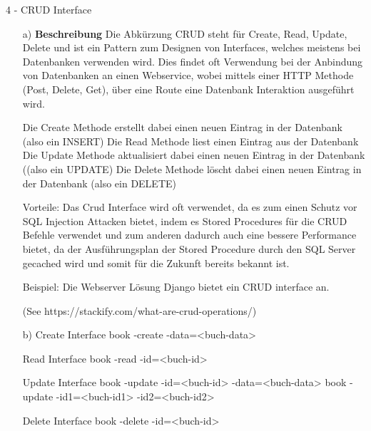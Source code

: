 \documentclass[a4paper]{article}
\begin{document}
\begin{exercise}{4 - CRUD Interface} 
\begin{itemize}
\item[a)]\textbf{Beschreibung}
Die Abkürzung CRUD steht für Create, Read, Update, Delete und ist ein Pattern zum
Designen von Interfaces, welches meistens bei Datenbanken verwenden wird.
Dies findet oft Verwendung bei der Anbindung von Datenbanken an einen Webservice,
wobei mittels einer HTTP Methode (Post, Delete, Get), über eine Route eine
Datenbank Interaktion ausgeführt wird.

Die Create Methode erstellt dabei einen neuen Eintrag in der Datenbank (also ein INSERT)
Die Read Methode liest einen Eintrag aus der Datenbank
Die Update Methode aktualisiert dabei einen neuen Eintrag in der Datenbank ((also ein UPDATE)
Die Delete Methode löscht dabei einen neuen Eintrag in der Datenbank (also ein DELETE)

Vorteile:
Das Crud Interface wird oft verwendet, da es zum einen Schutz vor SQL Injection Attacken bietet,
indem es Stored Procedures für die CRUD Befehle verwendet und zum anderen dadurch auch eine bessere
Performance bietet, da der Ausführungsplan der Stored Procedure durch den SQL Server gecached wird
und somit für die Zukunft bereits bekannt ist.

Beispiel:
Die Webserver Lösung Django bietet ein CRUD interface an.

(See https://stackify.com/what-are-crud-operations/)

\item[b)]
Create Interface
book -create -data=<buch-data>

Read Interface
book -read -id=<buch-id>

Update Interface
book -update -id=<buch-id> -data=<buch-data>
book -update -id1=<buch-id1> -id2=<buch-id2>

Delete Interface
book -delete -id=<buch-id>

\end{itemize}
\end{exercise}
\end{document}
